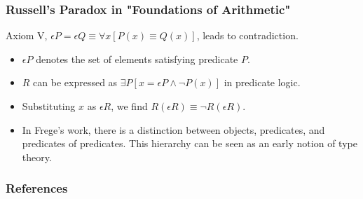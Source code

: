\documentclass[unicode, 14pt, aspectratio=169]{beamer}
\begin{document}
\begin{frame}
  \frametitle{Russell's Paradox in "Foundations of Arithmetic"}
  {\large Axiom V, $\epsilon P=\epsilon Q \equiv \forall x [P(x)\equiv Q(x)]$, leads to contradiction.}
  \begin{itemize}
  \item $\epsilon P$ denotes the set of elements satisfying predicate $P$.
  \item $R$ can be expressed as $\exists P [x = \epsilon P \wedge \neg P(x)]$ in predicate logic.
  \item Substituting $x$ as $\epsilon R$, we find $R(\epsilon R) \equiv \neg R(\epsilon R)$.    
  \item In Frege's work, there is a distinction between objects, predicates, and predicates of predicates. This hierarchy can be seen as an early notion of type theory.
  \end{itemize}
\end{frame}
\begin{frame}[allowframebreaks,t]
  \frametitle{References}
  \printbibliography
  \nocite{*}
\end{frame}
\end{document}
